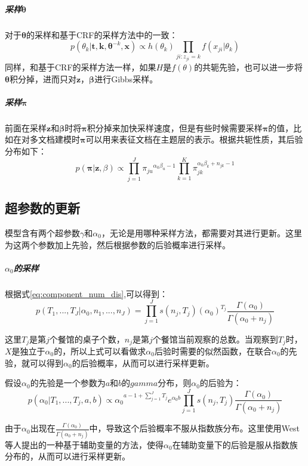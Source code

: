 \subparagraph{采样${\bm \theta}$}
对于${\bm \theta}$的采样和基于CRF的采样方法中的一致：
\begin{equation}
p(\theta_k|{\bm t},{\bm k},{\bm \theta^{-k}},{\bm x}) \propto h(\theta_k) \prod_{ji:z_{ji}=k}f(x_{ji}|\theta_k)
\end{equation}
同样，和基于CRF的采样方法一样，如果$H$是$f(\theta)$的共轭先验，也可以进一步将${\bm \theta}$积分掉，进而只对${\bm z}$，${\bm \beta}$进行Gibbs采样。

\subparagraph{采样${\bm \pi}$}
前面在采样${\bm z}$和${\bm \beta}$时将${\bm \pi}$积分掉来加快采样速度，但是有些时候需要采样${\bm \pi}$的值，比如在对多文档建模时${\bm \pi}$可以用来表征文档在主题层的表示\cite{blei2003latent}。根据共轭性质，其后验分布如下：
\begin{equation}
p({\bm \pi}|{\bm z,\beta}) \propto \prod_{j=1}^{J}{{\pi_{ju}}^{\alpha_0\beta_u-1}  \prod_{k=1}^{K}{\pi_{jk}^{\alpha_0\beta_k+n_{jk}-1}} }
\end{equation}

\subsection{超参数的更新}\label{subsec:hdp_hyper}
模型含有两个超参数$\gamma$和$\alpha_0$，无论是用哪种采样方法，都需要对其进行更新。这里为这两个参数加上先验，然后根据参数的后验概率进行采样。
\subparagraph{$\alpha_0$的采样}
根据式\eqref{eq:component_num_dis},可以得到：
\begin{equation}
p(T_1,...,T_J|\alpha_0,n_1,...,n_J) = \prod_{j=1}^J{s(n_{j},T_j)(\alpha_0)^{T_j}\frac{\Gamma(\alpha_0)}{\Gamma(\alpha_0+n_j)}} \label{T_antoniak}
\end{equation} 

这里$T_j$是第$j$个餐馆的桌子个数，$n_j$是第$j$个餐馆当前观察的总数。当观察到$T_j$时，$X$是独立于$\alpha_0$的，所以上式可以看做求$\alpha_0$后验时需要的似然函数，在联合$\alpha_0$的先验，就可以得到$\alpha_0$的后验概率，从而可以进行采样更新。

假设$\alpha_0$的先验是一个参数为$a$和$b$的$gamma$分布，则${\alpha_0}$的后验为：
\begin{equation}
p(\alpha_0|T_1,...,T_j,a,b) \propto  {\alpha_0}^{a-1+\sum_{j=1}^J{T_j}} e^{\alpha_0b} \prod_{j=1}^J{s(n_{j},T_j)\frac{\Gamma(\alpha_0)}{\Gamma(\alpha_0+n_j)}}
\end{equation} 

由于$\alpha_0$出现在$\frac{\Gamma(\alpha_0)}{\Gamma(\alpha_0+n_j)}$中，导致这个后验概率不服从指数族分布。这里使用West等人提出的一种基于辅助变量的方法\cite{west:92,escobar:95,rasmussen:99}，使得$\alpha_0$在辅助变量下的后验是服从指数族分布的，从而可以进行采样更新。

